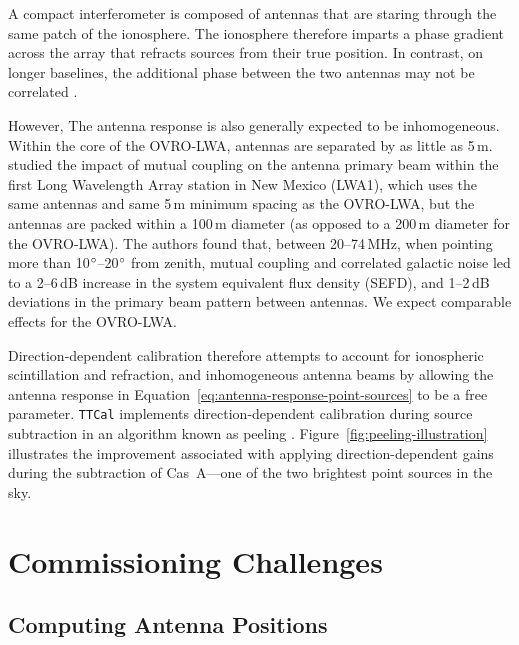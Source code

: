 \begin{bibunit}
A compact interferometer is composed of antennas that are staring through the same patch of the
ionosphere. The ionosphere therefore imparts a phase gradient across the array that refracts sources
from their true position.  In contrast, on longer baselines, the additional phase between the two
antennas may not be correlated \citep{2005ASPC..345..399L}.

However, The antenna response is also generally expected to be inhomogeneous.  Within the core of
the OVRO-LWA, antennas are separated by as little as 5\,m.  \citet{2011ITAP...59.1855E} studied the
impact of mutual coupling on the antenna primary beam within the first Long Wavelength Array station
in New Mexico (LWA1), which uses the same antennas and same 5\,m minimum spacing as the OVRO-LWA,
but the antennas are packed within a 100\,m diameter (as opposed to a 200\,m diameter for the
OVRO-LWA). The authors found that, between 20--74\,MHz, when pointing more than
10$\mbox{$^\circ$}$--20$\mbox{$^\circ$}$ from zenith, mutual coupling and correlated galactic noise led to a
2--6\,dB increase in the system equivalent flux density (SEFD), and 1--2\,dB deviations in the
primary beam pattern between antennas. We expect comparable effects for the OVRO-LWA.

Direction-dependent calibration therefore attempts to account for ionospheric scintillation and
refraction, and inhomogeneous antenna beams by allowing the antenna response in
Equation~\ref{eq:antenna-response-point-sources} to be a free parameter.  \texttt{TTCal} implements
direction-dependent calibration during source subtraction in an algorithm known as peeling
\citep{2008ISTSP...2..707M}. Figure~\ref{fig:peeling-illustration} illustrates the improvement
associated with applying direction-dependent gains during the subtraction of Cas~A---one of the two
brightest point sources in the sky.

\section{Commissioning Challenges}
\label{sec:commissioning-challenges}

\subsection{Computing Antenna Positions}


\end{bibunit}
